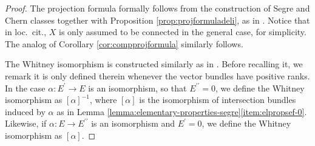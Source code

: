 \documentclass[11pt]{article}
\providecommand{\loccit}{\textup{loc.\ cit.}}
\theoremstyle{plain}
\theoremstyle{definition}
\newcommand{\bis}{\prime\prime}
\begin{document}
\begin{proof}

The projection formula formally follows from the construction of Segre and Chern classes together with Proposition \ref{prop:projformuladeli}, as in
\cite[\textsection V.4.2]{Elkikfib}. Notice that in \loccit, $X$ is only assumed to be connected in the general case, for simplicity. The analog of Corollary \ref{cor:compprojformula} similarly follows.

The Whitney isomorphism is constructed similarly as in \cite[\textsection V.4.8]{Elkikfib}. Before recalling it, we remark it is only defined therein whenever the vector bundles have positive ranks. In the case $\alpha: E^{\prime} \to E$ is an isomorphism, so that $E^{\bis}=0$, we define the Whitney isomorphism as $[\alpha]^{-1}$, where $[\alpha]$ is the isomorphism of intersection bundles induced by $\alpha$ as in Lemma \ref{lemma:elementary-properties-segre}\eqref{item:elpropsef-0}. Likewise, if $\alpha: E\to E^{\bis}$ is an isomorphism and $E^{\prime}=0$, we define the Whitney isomorphism as $[\alpha]$.


\end{proof}
\end{document}
